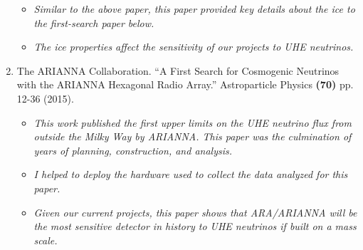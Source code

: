 \documentclass[../../main.tex]{subfiles}
\begin{document}
\begin{enumerate}
\begin{itemize}
\item \textit{Similar to the above paper, this paper provided key details about the ice to the first-search paper below.}
\item \textit{The ice properties affect the sensitivity of our projects to UHE neutrinos.}
\end{itemize}
\item The ARIANNA Collaboration. ``A First Search for Cosmogenic Neutrinos with the ARIANNA Hexagonal Radio Array.'' Astroparticle Physics \textbf{(70)} pp. 12-36 (2015).
\begin{itemize}
\item \textit{This work published the first upper limits on the UHE neutrino flux from outside the Milky Way by ARIANNA.  This paper was the culmination of years of planning, construction, and analysis.}
\item \textit{I helped to deploy the hardware used to collect the data analyzed for this paper.}
\item \textit{Given our current projects, this paper shows that ARA/ARIANNA will be the most sensitive detector in history to UHE neutrinos if built on a mass scale.}
\end{itemize}
\end{enumerate}
\end{document}

